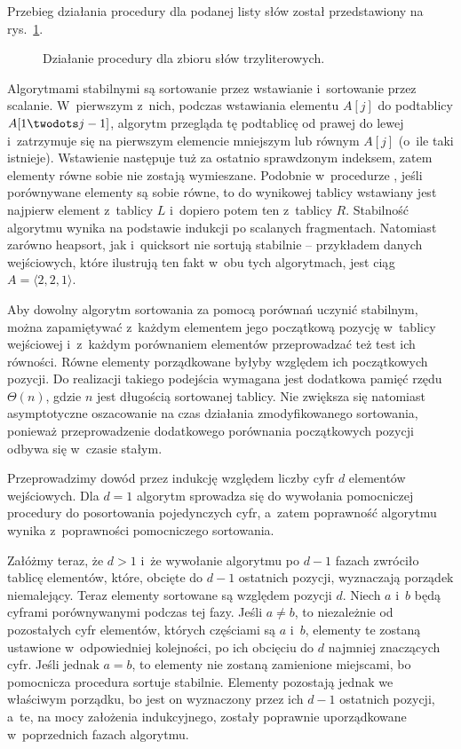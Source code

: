 
\exercise %
Przebieg działania procedury  dla podanej listy słów został przedstawiony na rys.\ \ref{fig:8.3-1}.
\begin{figure}[!ht]
	\centering 
	\caption{Działanie procedury  dla zbioru słów trzyliterowych.} \label{fig:8.3-1}
\end{figure}

\exercise %
Algorytmami stabilnymi są sortowanie przez wstawianie i~sortowanie przez scalanie.
W~pierwszym z~nich, podczas wstawiania elementu $A[j]$ do podtablicy $A[1\twodots j-1]$, algorytm przegląda tę podtablicę od prawej do lewej i~zatrzymuje się na pierwszym elemencie mniejszym lub równym $A[j]$ (o~ile taki istnieje).
Wstawienie następuje tuż za ostatnio sprawdzonym indeksem, zatem elementy równe sobie nie zostają wymieszane.
Podobnie w~procedurze , jeśli porównywane elementy są sobie równe, to do wynikowej tablicy wstawiany jest najpierw element z~tablicy $L$ i~dopiero potem ten z~tablicy $R$.
Stabilność algorytmu wynika na podstawie indukcji po scalanych fragmentach.
Natomiast zarówno heapsort, jak i~quicksort nie sortują stabilnie -- przykładem danych wejściowych, które ilustrują ten fakt w~obu tych algorytmach, jest ciąg $A=\langle2,2,1\rangle$.

Aby dowolny algorytm sortowania za pomocą porównań uczynić stabilnym, można zapamiętywać z~każdym elementem jego początkową pozycję w~tablicy wejściowej i~z~każdym porównaniem elementów przeprowadzać też test ich równości.
Równe elementy porządkowane byłyby względem ich początkowych pozycji.
Do realizacji takiego podejścia wymagana jest dodatkowa pamięć rzędu $\Theta(n)$, gdzie $n$ jest długością sortowanej tablicy.
Nie zwiększa się natomiast asymptotyczne oszacowanie na czas działania zmodyfikowanego sortowania, ponieważ przeprowadzenie dodatkowego porównania początkowych pozycji odbywa się w~czasie stałym.

\exercise %
Przeprowadzimy dowód przez indukcję względem liczby cyfr $d$ elementów wejściowych.
Dla $d=1$ algorytm  sprowadza się do wywołania pomocniczej procedury do posortowania pojedynczych cyfr, a~zatem poprawność algorytmu wynika z~poprawności pomocniczego sortowania.

Załóżmy teraz, że $d>1$ i~że wywołanie algorytmu  po $d-1$ fazach zwróciło tablicę elementów, które, obcięte do $d-1$ ostatnich pozycji, wyznaczają porządek niemalejący.
Teraz elementy sortowane są względem pozycji $d$.
Niech $a$ i~$b$ będą cyframi porównywanymi podczas tej fazy.
Jeśli $a\ne b$, to niezależnie od pozostałych cyfr elementów, których częściami są $a$ i~$b$, elementy te zostaną ustawione w~odpowiedniej kolejności, po ich obcięciu do $d$ najmniej znaczących cyfr.
Jeśli jednak $a=b$, to elementy nie zostaną zamienione miejscami, bo pomocnicza procedura sortuje stabilnie.
Elementy pozostają jednak we właściwym porządku, bo jest on wyznaczony przez ich $d-1$ ostatnich pozycji, a~te, na mocy założenia indukcyjnego, zostały poprawnie uporządkowane w~poprzednich fazach algorytmu.


